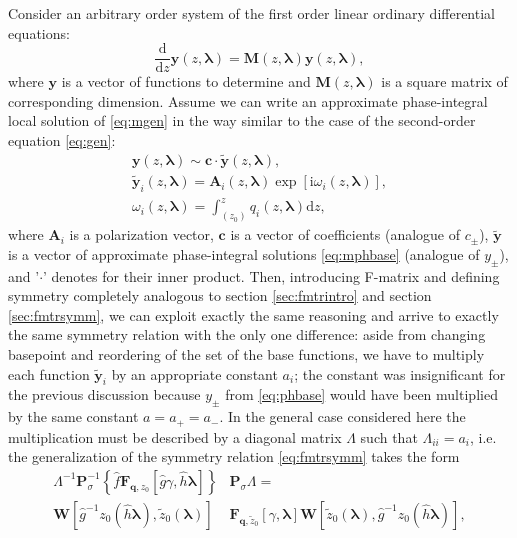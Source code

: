 \documentclass[atmp]{ipart_v1}
\def\rmd{\mathrm{d}}
\def\rmi{\mathrm{i}}
\def\lmbd{\bm{\lambda}}
\def\f{\hat{f}}
\def\g{\hat{g}}
\def\h{\hat{h}}
\def\P{\bm{P}_\sigma}
\def\F{\bm{F}}
\def\W{\bm{W}}
\def\w{\omega}
\newcommand\eref[1]{\eqref{#1}}
\newcommand\sref[1]{section \ref{#1}}
\begin{document}
Consider an arbitrary order system of the first order linear ordinary differential equations:
\begin{equation}
\frac{\rmd}{\rmd z} \bm{y}(z,\lmbd) = \bm{M}(z,\lmbd) \bm{y}(z,\lmbd),
\label{eq:mgen}
\end{equation}
where $\bm{y}$ is a vector of functions to determine and $\bm{M}(z,\lmbd)$ is a square matrix of corresponding dimension.
Assume we can write an approximate phase-integral local solution of \eref{eq:mgen} in the way
similar to the case of the second-order equation \eref{eq:gen}:
\begin{subequations}
\label{eq:mphsint}
\begin{eqnarray}
\bm{y}(z,\lmbd) \sim \bm{c} \cdot \bm{\tilde{y}}(z,\lmbd), \label{eq:mgensol}
\\
\bm{\tilde{y}}_i(z,\lmbd) = \bm{A}_i(z,\lmbd) \exp [\rmi \w_i(z,\lmbd)], \label{eq:mphbase}
\\
\w_i(z,\lmbd)=\int_{(z_0)}^z q_i(z,\lmbd) \rmd z, \label{eq:mphase}
\end{eqnarray}
\end{subequations}
where $\bm{A}_i$ is a polarization vector, $\bm{c}$ is a vector of coefficients (analogue of $c_\pm$), 
$\bm{\tilde{y}}$ is a vector of approximate phase-integral solutions \eref{eq:mphbase} (analogue of $y_\pm$), 
and '$\cdot$' denotes for their inner product.
Then, introducing F-matrix and defining symmetry completely analogous to \sref{sec:fmtrintro} and \sref{sec:fmtrsymm},
we can exploit exactly the same reasoning and arrive to exactly the same symmetry relation with the only one difference:
aside from changing basepoint and reordering of the set of the base functions, we have to multiply each function $\bm{\tilde{y}}_i$ 
by an appropriate constant $a_i$; the constant was insignificant for the previous discussion because $y_\pm$ from \eref{eq:phbase} 
would have been multiplied by the same constant $a = a_+ = a_-$. In the general case considered here the multiplication
must be described by a diagonal matrix $\bm{\mathit{\Lambda}}$ such that $\bm{\mathit{\Lambda}}_{ii} = a_i$, i.e. the generalization of the
symmetry relation \eref{eq:fmtrsymm} takes the form
\begin{equation}
\begin{split}
\bm{\mathit{\Lambda}}^{-1}\P^{-1} \left\{ \f \F_{\bm{q},z_0} \left[\g \gamma, \h \lmbd \right] \right\} &\P \bm{\mathit{\Lambda}} =
 \\
   \W \left[ \g^{-1} z_0(\h\lmbd), \tilde{z}_0(\lmbd) \right]&
   \F_{\bm{q},\tilde{z}_0} \left[ \gamma, \lmbd \right]
   \W \left[ \tilde{z}_0(\lmbd), \g^{-1} z_0(\h\lmbd) \right],
\end{split}
\label{eq:mfmtrsymm}
\end{equation}
\end{document}
